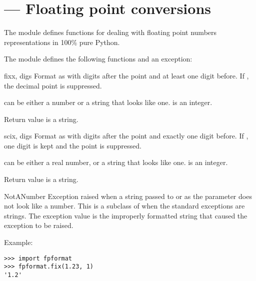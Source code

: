 \section{ ---
         Floating point conversions}



The  module defines functions for dealing with
floating point numbers representations in 100\% pure
Python. 

The  module defines the following functions and an
exception:


\begin{funcdesc}{fix}{x, digs}
Format  as  with  digits after the
point and at least one digit before.
If , the decimal point is suppressed.

 can be either a number or a string that looks like
one.  is an integer.

Return value is a string.
\end{funcdesc}

\begin{funcdesc}{sci}{x, digs}
Format  as  with  digits after the 
point and exactly one digit before.
If , one digit is kept and the point is suppressed.

 can be either a real number, or a string that looks like
one.  is an integer.

Return value is a string.
\end{funcdesc}

\begin{excdesc}{NotANumber}
Exception raised when a string passed to  or
 as the  parameter does not look like a number.
This is a subclass of  when the standard
exceptions are strings.  The exception value is the improperly
formatted string that caused the exception to be raised.
\end{excdesc}

Example:

\begin{verbatim}
>>> import fpformat
>>> fpformat.fix(1.23, 1)
'1.2'
\end{verbatim}
